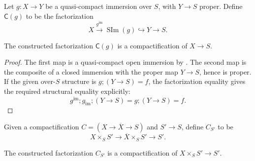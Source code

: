 \begin{definition}
  \label{def:nagata-immersion-compactification}

  Let $g\colon X\to Y$ be a quasi-compact immersion over $S$, with
  $Y\to S$ proper.  Define $\mathsf C(g)$ to be the factorization
  \[
    X\xrightarrow{g^{\mathrm{im}}}
    \operatorname{SIm}(g)\hookrightarrow Y\longrightarrow S.
  \]
\end{definition}

\begin{lemma}
  \label{lemma:nagata-immersion-into-proper}

  The constructed factorization $\mathsf C(g)$ is a compactification of
  $X\to S$.
\end{lemma}

\begin{proof}
  The first map is a quasi-compact open immersion by
  .  The second map is the
  composite of a closed immersion with the proper map $Y\to S$, hence is
  proper.  If the given over-$S$ structure is
  $g;(Y\to S)=f$, the factorization equality gives the required structural
  equality explicitly:
  \[
    g^{\mathrm{im}};g_{\mathrm{im}};(Y\to S)
      =g;(Y\to S)=f.
  \]
\end{proof}

\begin{definition}
  \label{def:nagata-compactification-base-change}

  Given a compactification $C=(X\to\overline X\to S)$ and $S'\to S$, define
  $C_{S'}$ to be
  \[
    X\times_SS'\longrightarrow\overline X\times_SS'\longrightarrow S'.
  \]
\end{definition}

\begin{lemma}
  \label{lemma:nagata-compactification-base-change}

  The constructed factorization $C_{S'}$ is a compactification of
  $X\times_SS'\to S'$.
\end{lemma}


